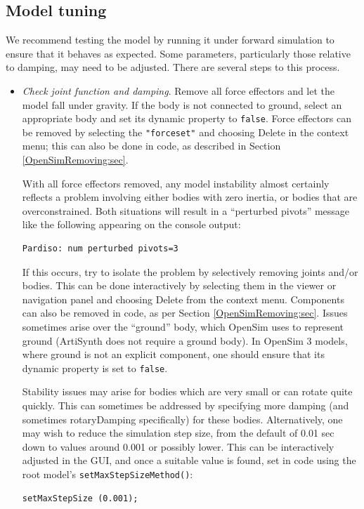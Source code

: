 \subsection{Model tuning}

We recommend testing the model by running it under forward simulation to ensure
that it behaves as expected. Some parameters, particularly those relative to
damping, may need to be adjusted.  There are several steps to this process.

\begin{itemize}

\item {\it Check joint function and damping}. Remove all force effectors and
let the model fall under gravity. If the body is not connected to ground,
select an appropriate body and set its {\sf dynamic} property to {\tt false}.
Force effectors can be removed by selecting the {\tt "forceset"} and choosing
{\sf Delete} in the context menu; this can also be done in code, as described
in Section \ref{OpenSimRemoving:sec}. 

\begin{sideblock}
With all force effectors removed, any model instability almost certainly
reflects a problem involving either bodies with zero inertia, or bodies that
are overconstrained. Both situations will result in a ``perturbed pivots''
message like the following appearing on the console output:
%
\begin{verbatim}
Pardiso: num perturbed pivots=3
\end{verbatim}
%
If this occurs, try to isolate the problem by selectively removing joints
and/or bodies. This can be done interactively by selecting them in the viewer
or navigation panel and choosing {\sf Delete} from the context menu.
Components can also be removed in code, as per
Section \ref{OpenSimRemoving:sec}.  Issues sometimes arise over the ``ground''
body, which OpenSim uses to represent ground (ArtiSynth does not require a
ground body). In OpenSim 3 models, where ground is not an explicit component,
one should ensure that its {\sf dynamic} property is set to {\tt false}.
\end{sideblock}

\begin{sideblock}
Stability issues may arise for bodies which are very small or can rotate quite
quickly. This can sometimes be addressed by specifying more damping (and
sometimes {\sf rotaryDamping} specifically) for these bodies. Alternatively,
one may wish to reduce the simulation step size, from the default of 0.01 sec
down to values around 0.001 or possibly lower. This can be interactively
adjusted in the GUI, and once a suitable value is found, set in code using the
root model's {\tt setMaxStepSizeMethod()}:
%
\begin{lstlisting}[]
   setMaxStepSize (0.001);
\end{lstlisting}
%
\end{sideblock}


\end{itemize}
